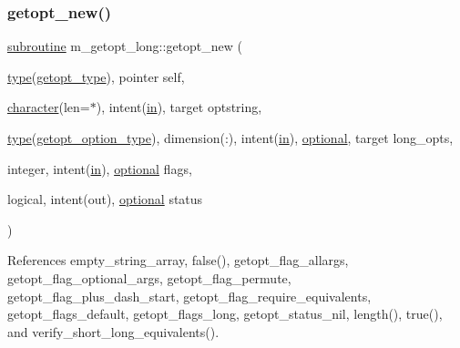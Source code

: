 \subsubsection{\texorpdfstring{getopt\+\_\+new()}{getopt\_new()}}
{\footnotesize\ttfamily \hyperlink{M__stopwatch_83_8txt_acfbcff50169d691ff02d4a123ed70482}{subroutine} m\+\_\+getopt\+\_\+long\+::getopt\+\_\+new (\begin{DoxyParamCaption}\item[{\hyperlink{stop__watch_83_8txt_a70f0ead91c32e25323c03265aa302c1c}{type}(\hyperlink{structm__getopt__long_1_1getopt__type}{getopt\+\_\+type}), pointer}]{self,  }\item[{\hyperlink{option__stopwatch_83_8txt_abd4b21fbbd175834027b5224bfe97e66}{character}(len=$\ast$), intent(\hyperlink{M__journal_83_8txt_afce72651d1eed785a2132bee863b2f38}{in}), target}]{optstring,  }\item[{\hyperlink{stop__watch_83_8txt_a70f0ead91c32e25323c03265aa302c1c}{type}(\hyperlink{structm__getopt__long_1_1getopt__option__type}{getopt\+\_\+option\+\_\+type}), dimension(\+:), intent(\hyperlink{M__journal_83_8txt_afce72651d1eed785a2132bee863b2f38}{in}), \hyperlink{option__stopwatch_83_8txt_aa4ece75e7acf58a4843f70fe18c3ade5}{optional}, target}]{long\+\_\+opts,  }\item[{integer, intent(\hyperlink{M__journal_83_8txt_afce72651d1eed785a2132bee863b2f38}{in}), \hyperlink{option__stopwatch_83_8txt_aa4ece75e7acf58a4843f70fe18c3ade5}{optional}}]{flags,  }\item[{logical, intent(out), \hyperlink{option__stopwatch_83_8txt_aa4ece75e7acf58a4843f70fe18c3ade5}{optional}}]{status }\end{DoxyParamCaption})}



References empty\+\_\+string\+\_\+array, false(), getopt\+\_\+flag\+\_\+allargs, getopt\+\_\+flag\+\_\+optional\+\_\+args, getopt\+\_\+flag\+\_\+permute, getopt\+\_\+flag\+\_\+plus\+\_\+dash\+\_\+start, getopt\+\_\+flag\+\_\+require\+\_\+equivalents, getopt\+\_\+flags\+\_\+default, getopt\+\_\+flags\+\_\+long, getopt\+\_\+status\+\_\+nil, length(), true(), and verify\+\_\+short\+\_\+long\+\_\+equivalents().


